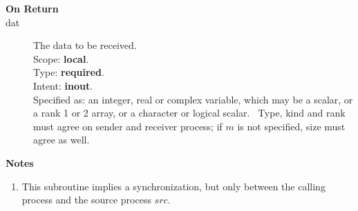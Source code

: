 \begin{description}
\item[\bf On Return]
\item[dat] The data to be received.\\
Scope: {\bf local}.\\
Type: {\bf required}.\\
Intent: {\bf inout}.\\
Specified as: an integer, real or complex variable, which may be a
scalar, or a rank 1 or 2 array, or a character or logical scalar. \
Type, kind and  rank must agree on sender and receiver process; if $m$ is
not specified, size must agree as well. 
\end{description}

{\par\noindent\large\bfseries Notes}
\begin{enumerate}
\item This subroutine implies a synchronization, but only between the
  calling process and the source  process $src$.
\end{enumerate}
